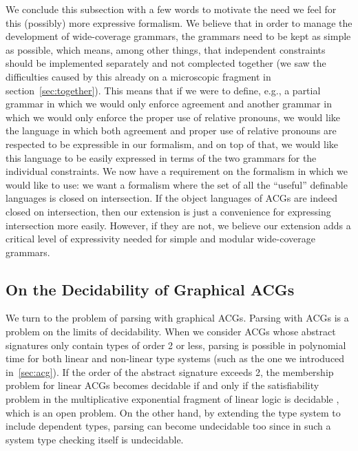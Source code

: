 We conclude this subsection with a few words to motivate the need we
feel for this (possibly) more expressive formalism. We believe that in
order to manage the development of wide-coverage grammars, the grammars
need to be kept as simple as possible, which means, among other things,
that independent constraints should be implemented separately and not
complected together (we saw the difficulties caused by this already on a
microscopic fragment in section~\ref{sec:together}). This means that if
we were to define, e.g., a partial grammar in which we would only
enforce agreement and another grammar in which we would only enforce the
proper use of relative pronouns, we would like the language in which
both agreement and proper use of relative pronouns are respected to be
expressible in our formalism, and on top of that, we would like this
language to be easily expressed in terms of the two grammars for the
individual constraints. We now have a requirement on the formalism in
which we would like to use: we want a formalism where the set of all the
``useful'' definable languages is closed on intersection. If the object
languages of ACGs are indeed closed on intersection, then our extension
is just a convenience for expressing intersection more easily. However,
if they are not, we believe our extension adds a critical level of
expressivity needed for simple and modular wide-coverage grammars.


\subsection{On the Decidability of Graphical ACGs}
\label{ssec:graphical-decidability}

We turn to the problem of parsing with graphical ACGs. Parsing with ACGs
is a problem on the limits of decidability. When we consider ACGs whose
abstract signatures only contain types of order 2 or less, parsing is
possible in polynomial time for both linear \cite{salvati2005problemes}
and non-linear \cite{kanazawa2007parsing} type systems (such as the one
we introduced in~\ref{sec:acg}). If the order of the abstract signature
exceeds 2, the membership problem for linear ACGs becomes decidable if
and only if the satisfiability problem in the multiplicative exponential
fragment of linear logic is decidable \cite{de2004vector}, which is an
open problem. On the other hand, by extending the type system to include
dependent types, parsing can become undecidable too since in such a
system type checking itself is undecidable.

